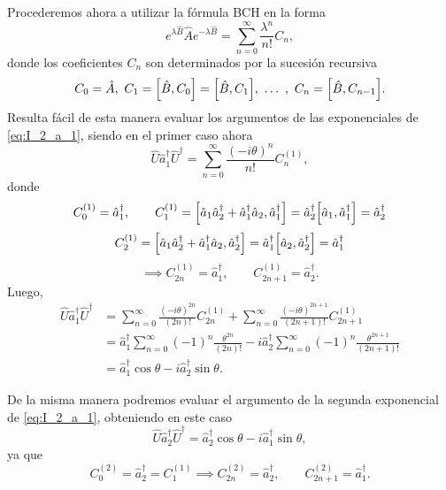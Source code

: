 \documentclass{scrartcl}
\renewcommand{\a}{\hat{a}}
\DeclareRobustCommand{\[}{\begin{equation}}
\DeclareRobustCommand{\]}{\end{equation}}
\begin{document}
\begin{enumerate}
\begin{enumerate}
        Procederemos ahora a utilizar la fórmula BCH en la forma
        \[ e^{\lambda \hat B} \hat A e^{-\lambda \hat B} = \sum_{n = 0}^\infty \frac{\lambda^n}{n!} C_n, \]
        donde los coeficientes $C_n$ son determinados por la sucesión recursiva
        \[ C_0 = \hat A, \ C_1 = \comm{\hat B}{C_0} = \comm{\hat B}{C_1}, \ \dots \ , \ C_n = \comm{\hat B}{C_{n - 1}}. \]
        Resulta fácil de esta manera evaluar los argumentos de las exponenciales de \eqref{eq:I_2_a_1}, siendo en el primer caso ahora
        \[ \hat U \a_1^\dagger \hat U^\dagger = \sum_{n = 0}^\infty \frac{(-i\theta)^n}{n!} C^{(1)}_n, \]
        donde
        \[ C^{(1)}_0 = \a_1^\dagger, \quad \quad C^{(1)}_1 = \comm{\a_1 \a_2^\dagger + \a_1^\dagger \a_2}{\a_1^\dagger} = \a_2^\dagger \comm{\a_1}{\a_1^\dagger} = \a_2^\dagger \]
        \[ C^{(1)}_2 = \comm{\a_1 \a_2^\dagger + \a_1^\dagger \a_2}{\a_2^\dagger} = \a_1^\dagger \comm{\a_2}{\a_2^\dagger} = \a_1^\dagger \]
        \[ \implies C^{(1)}_{2n} = \a_1^\dagger, \quad \quad C^{(1)}_{2n + 1} = \a_2^\dagger. \]
        Luego,
        \begin{align}
            \hat U \a_1^\dagger \hat U^\dagger &= \sum_{n = 0}^\infty \frac{(-i\theta)^{2n}}{(2n)!} C^{(1)}_{2n} + \sum_{n = 0}^\infty \frac{(-i\theta)^{2n + 1}}{(2n + 1)!} C^{(1)}_{2n + 1} \\
                &= \a_1^\dagger \sum_{n = 0}^\infty (-1)^n \frac{\theta^{2n}}{(2n)!} - i \a_2^\dagger \sum_{n = 0}^\infty (-1)^n \frac{\theta^{2n + 1}}{(2n + 1)!} \\
                &= \a_1^\dagger \cos\theta - i \a_2^\dagger \sin\theta.
        \end{align}
        
        De la misma manera podremos evaluar el argumento de la segunda exponencial de \eqref{eq:I_2_a_1}, obteniendo en este caso
        \[ \hat U \a_2^\dagger \hat U^\dagger = \a_2^\dagger \cos\theta - i \a_1^\dagger \sin\theta, \]
        ya que
        \[ C^{(2)}_0 = \a_2^\dagger = C^{(1)}_1 \implies C^{(2)}_{2n} = \a_2^\dagger, \quad \quad C^{(2)}_{2n + 1} = \a_1^\dagger. \]
        

\end{enumerate}
\end{enumerate}
\end{document}

